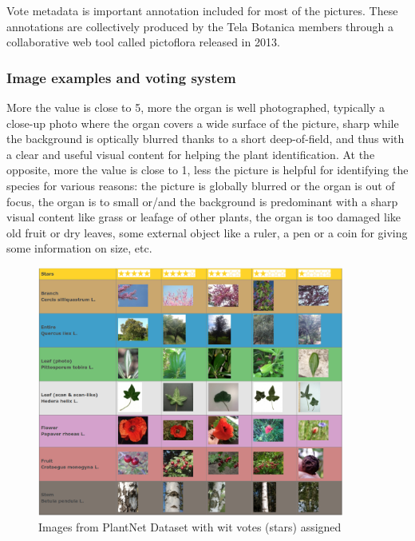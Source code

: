 \documentclass[../Main.tex]{subfiles}
\begin{document}
    Vote metadata is important annotation included for most of the pictures. These annotations are collectively produced by the Tela Botanica members through a collaborative web tool called pictoflora released in 2013.

    \subsubsection{Image examples and voting system}
    More the value is close to 5, more the organ is well photographed, typically a close-up photo where the organ covers a wide surface of the picture, sharp while the background is optically blurred thanks to a short deep-of-field, and thus with a clear and useful visual content for helping the plant identification. At the opposite, more the value is close to 1, less the picture is helpful for identifying the species for various reasons: the picture is globally blurred or the organ is out of focus, the organ is to small or/and the background is predominant with a sharp visual content like grass or leafage of other plants, the organ is too damaged like old fruit or dry leaves, some external object like a ruler, a pen or a coin for giving some information on size, etc.
    
    \begin{figure}[H]
        \centering
        \includegraphics[width=0.9\textwidth]{Images/datasets/04_plantnet_voting.png}
        \caption{Images from PlantNet Dataset with wit votes (stars) assigned \cite{plantnet-db}}
        \label{fig:plantnet-voting}
    \end{figure}
    
\end{document}
